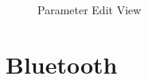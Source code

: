 \begin{figure}
	\centering
	\caption{Parameter Edit View}
	\label{fig:options-menu}
\end{figure}

\section{Bluetooth}

